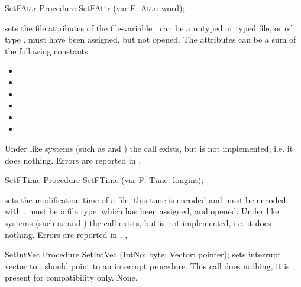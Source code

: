 \begin{procedure}{SetFAttr}
\Declaration
Procedure SetFAttr (var F; Attr: word);
\Description

 sets the file attributes of the file-variable .
  can be a untyped or typed file, or of type .  must
have been assigned, but not opened. The attributes can be a sum of the
following constants:
\begin{itemize}
\item {}
\item {}
\item {}
\item {}
\item {}
\item {}
\end{itemize}

\Portability
Under \unix like systems (such as \linux and \beos) the call exists, but is not implemented, 
i.e. it does nothing.
\Errors
Errors are reported in .
\SeeAlso
{}
\end{procedure}
\begin{procedure}{SetFTime}
\Declaration
Procedure SetFTime (var F; Time: longint);
\Description

 sets the modification time of a file,
this time is encoded and must be encoded with . 
 must be a file type, which has been assigned, and
opened.
\Portability
Under \unix like systems (such as \linux and \beos) the call exists, but is not implemented, 
i.e. it does nothing.
\Errors
Errors are reported in 
\SeeAlso
{}, ,
\end{procedure}

\begin{procedure}{SetIntVec}
\Declaration
Procedure SetIntVec (IntNo: byte; Vector: pointer);
\Description
{} sets interrupt vector  to .
 should point to an interrupt procedure.
\Portability
This call does nothing, it is present for compatibility only.
\Errors
None.
\SeeAlso
{}
\end{procedure}


